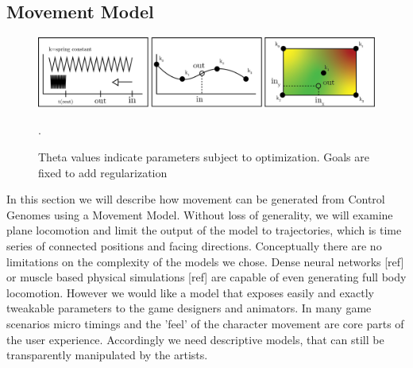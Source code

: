 \subsection{Movement Model}
\begin{figure}
    \centering
    \includegraphics[width=0.75\linewidth]{img/model_primitives}
    \caption{Theta values indicate parameters subject to optimization. Goals are fixed to add regularization}.
    \label{fig:movement:model}
\end{figure}
In this section we will describe how movement can be generated from Control Genomes using a Movement Model. Without loss of generality, we will examine plane locomotion and limit the output of the model to trajectories, which is time series of connected positions and facing directions. 
Conceptually there are no limitations on the complexity of the models we chose. Dense neural networks [ref] or muscle based physical simulations [ref] are capable of even generating full body locomotion. However we would like a model that exposes easily and exactly tweakable parameters to the game designers and animators. In many game scenarios micro timings and the 'feel' of the character movement are core parts of the user experience. Accordingly we need descriptive models, that can still be transparently manipulated by the artists. 

